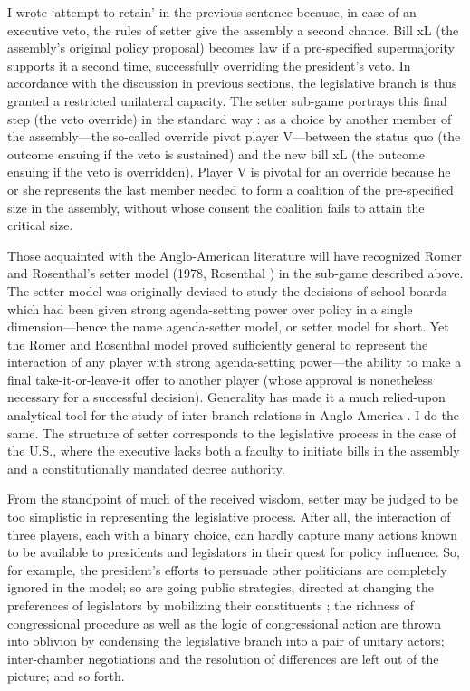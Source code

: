 I wrote ‘attempt to retain' in the previous sentence because, in case of an executive veto, the rules of setter give the assembly a second chance.  Bill xL (the assembly's original policy proposal) becomes law if a pre-specified supermajority supports it a second time, successfully overriding the president's veto.  In accordance with the discussion in previous sections, the legislative branch is thus granted a restricted unilateral capacity.  The setter sub-game portrays this final step (the veto override) in the standard way \citep[cf.][]{kiewiet.mccubbins.1988}: as a choice by another member of the assembly---the so-called override pivot player V---between the status quo (the outcome ensuing if the veto is sustained) and the new bill xL (the outcome ensuing if the veto is overridden).  Player V is pivotal for an override because he or she represents the last member needed to form a coalition of the pre-specified size in the assembly, without whose consent the coalition fails to attain the critical size.  

Those acquainted with the Anglo-American literature will have recognized Romer and Rosenthal's setter model (1978, Rosenthal \citeyear{rosenthal.1990}) in the sub-game described above. The setter model was originally devised to study the decisions of school boards which had been given strong agenda-setting power over policy in a single dimension---hence the name agenda-setter model, or setter model for short.  Yet the Romer and Rosenthal model proved sufficiently general to represent the interaction of any player with strong agenda-setting power---the ability to make a final take-it-or-leave-it offer to another player (whose approval is nonetheless necessary for a successful decision).  Generality has made it a much relied-upon analytical tool for the study of inter-branch relations in Anglo-America \citep{kiewiet.mccubbins.1988,baron.ferejohn.1989,krehbiel.1998,cameron.2000}.  I do the same.  The structure of setter corresponds to the legislative process in the case of the U.S., where the executive lacks both a faculty to initiate bills in the assembly and a constitutionally mandated decree authority.  

From the standpoint of much of the received wisdom, setter may be judged to be too simplistic in representing the legislative process.  After all, the interaction of three players, each with a binary choice, can hardly capture many actions known to be available to presidents and legislators in their quest for policy influence.  So, for example, the president's efforts to persuade other politicians \citep{neustadt.1990} are completely ignored in the model; so are going public strategies, directed at changing the preferences of legislators by mobilizing their constituents \citep{kernell.1991,kernell.1993}; the richness of congressional procedure \citep{mccubbins.sullivan.congressBook.1987} as well as the logic of congressional action \citep[eg.][]{arnold.1990} are thrown into oblivion by condensing the legislative branch into a pair of unitary actors; inter-chamber negotiations and the resolution of differences \citep{hammond.miller.1987,tsebelis.money.1997} are left out of the picture; and so forth.  

